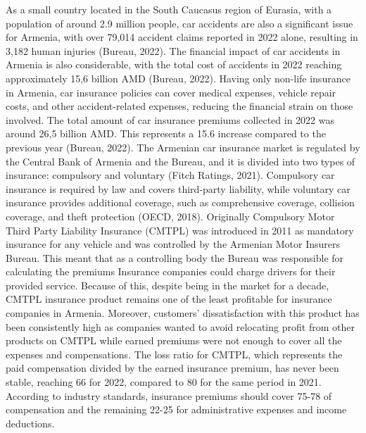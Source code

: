 \documentclass{IEEEtran}
\begin{document}
As a small country located in the South Caucasus region of Eurasia, with a population of around 2.9 million people, car accidents are also a significant issue for Armenia, with over 79,014 accident claims reported in 2022 alone, resulting in 3,182 human injuries (Bureau, 2022). The financial impact of car accidents in Armenia is also considerable, with the total cost of accidents in 2022 reaching approximately 15,6 billion AMD (Bureau, 2022). Having only non-life insurance in Armenia, car insurance policies can cover medical expenses, vehicle repair costs, and other accident-related expenses, reducing the financial strain on those involved. The total amount of car insurance premiums collected in 2022 was around 26,5 billion AMD. This represents a 15.6\text{\%} increase compared to the previous year (Bureau, 2022). The Armenian car insurance market is regulated by the Central Bank of Armenia and the Bureau, and it is divided into two types of insurance: compulsory and voluntary (Fitch Ratings, 2021). Compulsory car insurance is required by law and covers third-party liability, while voluntary car insurance provides additional coverage, such as comprehensive coverage, collision coverage, and theft protection (OECD, 2018). Originally  Compulsory Motor Third Party Liability Insurance (CMTPL) was introduced in 2011 as mandatory insurance for any vehicle and was controlled by the Armenian Motor Insurers Bureau. This meant that as a controlling body the Bureau was responsible for calculating the premiums Insurance companies could charge drivers for their provided service. Because of this, despite being in the market for a decade, CMTPL insurance product remains one of the least profitable for insurance companies in Armenia. Moreover, customers' dissatisfaction with this product has been consistently high as companies wanted to avoid relocating profit from other products on CMTPL while earned premiums were not enough to cover all the expenses and compensations. The loss ratio for CMTPL, which represents the paid compensation divided by the earned insurance premium, has never been stable, reaching 66\text{\%} for 2022, compared to 80\text{\%} for the same period in 2021. According to industry standards, insurance premiums should cover 75-78\text{\%} of compensation and the remaining 22-25\text{\%} for administrative expenses and income deductions.
\end{document}
